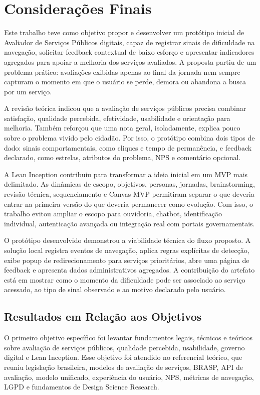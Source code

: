 \chapter{Considerações Finais}

Este trabalho teve como objetivo propor e desenvolver um protótipo inicial de
Avaliador de Serviços Públicos digitais, capaz de registrar sinais de dificuldade
na navegação, solicitar feedback contextual de baixo esforço e apresentar
indicadores agregados para apoiar a melhoria dos serviços avaliados. A proposta
partiu de um problema prático: avaliações exibidas apenas ao final da jornada nem
sempre capturam o momento em que o usuário se perde, demora ou abandona a busca
por um serviço.

A revisão teórica indicou que a avaliação de serviços públicos precisa combinar
satisfação, qualidade percebida, efetividade, usabilidade e orientação para
melhoria. Também reforçou que uma nota geral, isoladamente, explica pouco sobre o
problema vivido pelo cidadão. Por isso, o protótipo combina dois tipos de dado:
sinais comportamentais, como cliques e tempo de permanência, e feedback
declarado, como estrelas, atributos do problema, NPS e comentário opcional.

A Lean Inception contribuiu para transformar a ideia inicial em um MVP mais
delimitado. As dinâmicas de escopo, objetivos, personas, jornadas,
brainstorming, revisão técnica, sequenciamento e Canvas MVP permitiram separar o
que deveria entrar na primeira versão do que deveria permanecer como evolução.
Com isso, o trabalho evitou ampliar o escopo para ouvidoria, chatbot,
identificação individual, autenticação avançada ou integração real com portais
governamentais.

O protótipo desenvolvido demonstrou a viabilidade técnica do fluxo proposto. A
solução local registra eventos de navegação, aplica regras explícitas de
detecção, exibe popup de redirecionamento para serviços prioritários, abre uma
página de feedback e apresenta dados administrativos agregados. A contribuição do
artefato está em mostrar como o momento da dificuldade pode ser associado ao
serviço acessado, ao tipo de sinal observado e ao motivo declarado pelo usuário.

\section{Resultados em Relação aos Objetivos}

O primeiro objetivo específico foi levantar fundamentos legais, técnicos e
teóricos sobre avaliação de serviços públicos, qualidade percebida, usabilidade,
governo digital e Lean Inception. Esse objetivo foi atendido no referencial
teórico, que reuniu legislação brasileira, modelos de avaliação de serviços,
BRASP, API de avaliação, modelo unificado, experiência do usuário, NPS, métricas
de navegação, LGPD e fundamentos de Design Science Research.

